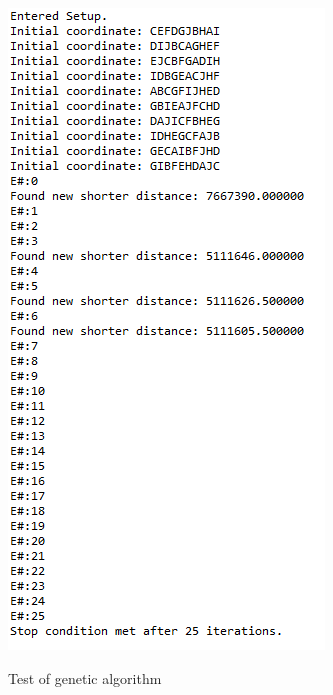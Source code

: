 \begin{figure}[H]
	\centering
	{\includegraphics[width=\textwidth/2]{Images/algo_test_sw.png}}\\[0.5cm]
	\caption{Test of genetic algorithm}
	\label{fig:algo_test_sw}
\end{figure}

